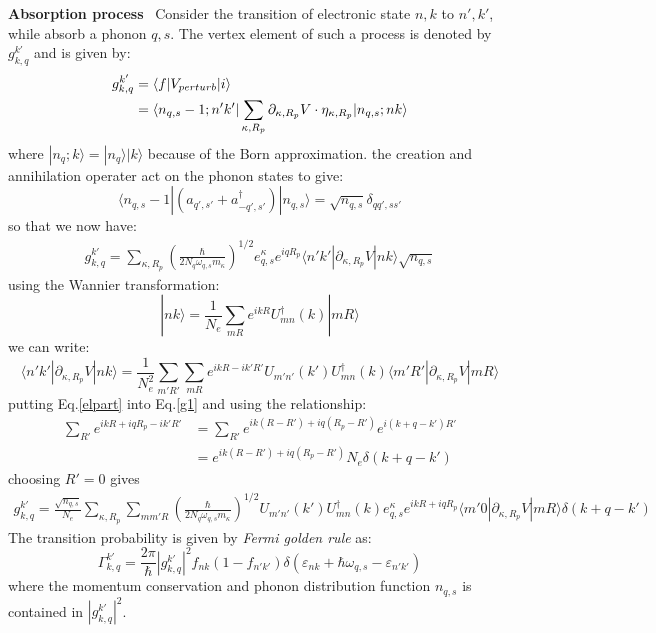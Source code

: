 \documentclass{article}
\begin{document}
\textbf{Absorption process} \ Consider the transition of electronic state $n,k$ to $n',k'$, while absorb a phonon
$q,s$. The vertex element of such a process is denoted by $g_{k,q}^{k'} $ and is given by:
\begin{align}
    g_{k,q}^{k'} &= \langle f | V_{perturb} | i \rangle  \notag \\
                 &= \langle n_{q,s}-1;n'k' | \sum_{\kappa, R_p} \partial_{\kappa, R_p}V \cdot \eta_{\kappa, R_p} | n_{q,s};nk \rangle
\end{align}
where $| n_q;k \rangle = |n_q \rangle | k \rangle$ because of the Born approximation. 
the creation and annihilation operater act on the phonon states to give:
\begin{equation}
    \langle n_{q,s}-1 | (a_{q',s'} + a_{-q',s'}^{\dagger}) | n_{q,s} \rangle = \sqrt{n_{q,s}} \delta_{qq',ss'}
\end{equation}
so that we now have:
\begin{align}
    g_{k,q}^{k'} = \sum_{\kappa, R_p} \left( \frac{\hbar}{2N_q \omega_{q,s} m_{\kappa}} \right)^{1/2} e_{q,s}^{\kappa} e^{iqR_p}
             \langle n' k' | \partial_{\kappa, R_p}V | nk \rangle \sqrt{n_{q,s}} \label{g1}
\end{align}
using the Wannier transformation:
\begin{equation}
    | nk \rangle = \frac{1}{N_e} \sum_{mR} e^{ikR} U^{\dagger}_{mn}(k) | mR \rangle
\end{equation}
we can write:
\begin{equation}
    \langle n' k' | \partial_{\kappa, R_p}V | nk \rangle 
    = \frac{1}{N_e^2}\sum_{m'R'}\sum_{mR} e^{ikR - ik'R'} 
      U_{m'n'}(k') U^{\dagger}_{mn}(k)  \langle m'R' | \partial_{\kappa,R_p}V | mR \rangle \label{elpart}
\end{equation}
putting Eq.\ref{elpart} into Eq.\ref{g1} and using the relationship:
\begin{align}
    \sum_{R'} e^{ikR + iqR_p - ik'R'} &= \sum_{R'} e^{ik(R-R') + iq(R_p-R')} e^{i(k+q-k')R'}  \\
                                    & = e^{ik(R-R') + iq(R_p-R')} N_e \delta(k+q-k') 
\end{align}
choosing $R' = 0$ gives
\begin{align}
    g_{k,q}^{k'} = \frac{\sqrt{n_{q,s}}}{N_e} \sum_{\kappa, R_p} \sum_{mm'R} \left( \frac{\hbar}{2N_q \omega_{q,s} m_{\kappa}} \right)^{1/2} 
    U_{m'n'}(k') U^{\dagger}_{mn}(k) e_{q,s}^{\kappa} e^{ikR + iqR_p}
             \langle m'0 | \partial_{\kappa, R_p}V | mR \rangle \delta(k+q-k') 
\end{align} 
The transition probability is given by \emph{Fermi golden rule} as:
\begin{equation}
    \Gamma_{k,q}^{k'} = \frac{2\pi}{\hbar} |g_{k,q}^{k'}|^2 f_{nk} (1-f_{n'k'}) \delta(\varepsilon_{nk} + \hbar\omega_{q,s} - \varepsilon_{n'k'})
\end{equation}
where the momentum conservation and phonon distribution function $n_{q,s}$ is contained in $|g_{k,q}^{k'}|^2$.
\end{document}
